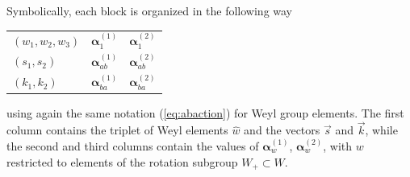 \documentclass[pdftex]{sigma}
\def\bal{\boldsymbol{\alpha}}
\theoremstyle{definition}
\numberwithin{equation}{section}
\begin{document}
Symbolically, each block is organized in the following way

\begin{table}[h!]\centering \renewcommand{\arraystretch}{1.2}
\centering
\begin{tabular}{|lll|}
\hline
$\left(w_1,w_2,w_3\right)$ & $\bal^{(1)}_{1}$ & $\bal^{(2)}_{1}$\\
$\left(s_1,s_2\right)$ & $\bal^{(1)}_{ab}$ & $\bal^{(2)}_{ab}$\\
$\left(k_1,k_2\right)$ & $\bal^{(1)}_{ba}$ & $\bal^{(2)}_{ba}$\\\hline
\end{tabular}
\end{table}
\noindent using again the same notation (\ref{eq:abaction}) for Weyl group elements.
The first column contains the
triplet of Weyl elements $\hat{w}$ and the vectors $\vec{s}$ and
$\vec{k}$, while the second and third columns contain the values of
$\bal^{(1)}_{w}$, $\bal^{(2)}_{w}$, with $w$ restricted to elements of the rotation subgroup $W_+\subset W$.
\end{document}
